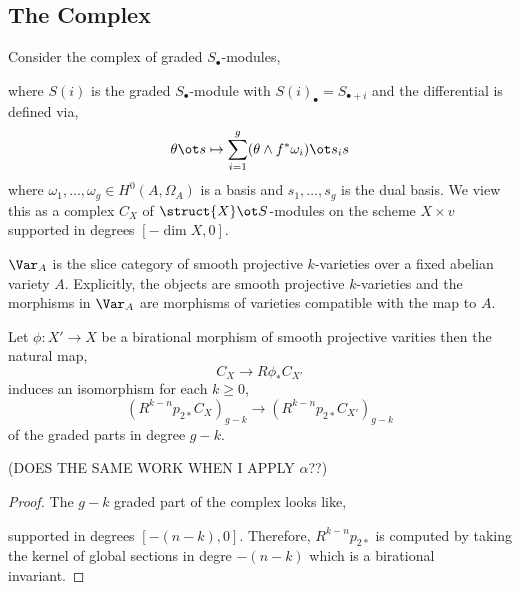\documentclass[12pt]{article}
\begin{document}
\subsection{The Complex}

Consider the complex of graded $S_\bullet$-modules,
\begin{center}
\end{center}
where $S(i)$ is the graded $S_\bullet$-module with $S(i)_{\bullet} = S_{\bullet + i}$ and the differential is defined via,
\[ \theta \ot s \mapsto \sum_{i = 1}^g (\theta \wedge f^* \omega_i) \ot s_i s \]
where $\omega_1, \dots, \omega_g \in H^0(A, \Omega_A)$ is a basis and $s_1, \dots, s_g$ is the dual basis. We view this as a complex $C_X$ of $\struct{X} \ot S$-modules on the scheme $X \times v$ supported in degrees $[-\dim{X}, 0]$.

\begin{defn}
$\Var_A$ is the slice category of smooth projective $k$-varieties over a fixed abelian variety $A$. Explicitly, the objects are smooth projective $k$-varieties and the morphisms in $\Var_A$ are morphisms of varieties compatible with the map to $A$.
\end{defn}

\begin{prop}
Let $\phi :  X' \to X$ be a birational morphism of smooth projective varities then the natural map,
\[ C_{X} \to R \phi_* C_{X'} \]
induces an isomorphism for each $k \ge 0$,
\[ (R^{k-n} p_{2 *} C_{X})_{g-k} \to (R^{k-n} p_{2 *} C_{X'})_{g-k} \]
of the graded parts in degree $g-k$.
\end{prop}

(DOES THE SAME WORK WHEN I APPLY $\alpha$??)

\begin{proof}
The $g-k$ graded part of the complex looks like,
\begin{center}
\end{center}
supported in degrees $[-(n-k), 0]$. Therefore, $R^{k-n} p_{2*}$ is computed by taking the kernel of global sections in degre $-(n-k)$ which is a birational invariant. 
\end{proof}
\end{document}
